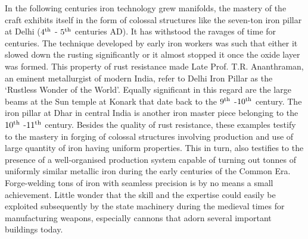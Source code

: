 In the following centuries iron technology grew manifolds, the mastery of the craft exhibits itself in the form of colossal structures like the seven-ton iron pillar at Delhi ($4^{\rm th}$ - $5^{\rm th}$ centuries AD). It has withstood the ravages of time for centuries. The technique developed by early iron workers was such that either it slowed down the rusting significantly or it almost stopped it once the oxide layer was formed. This property of rust resistance made Late Prof. T.R. Ananthraman, an eminent metallurgist of modern India, refer to Delhi Iron Pillar as the ‘Rustless Wonder of the World’. Equally significant in this regard are the large beams at the Sun temple at Konark that date back to the $9^{\rm th}$ -$10^{\rm th}$ century. The iron pillar at Dhar in central India is another iron master piece belonging to the $10^{\rm th}$ -$11^{\rm th}$ century. Besides the quality of rust resistance, these examples testify to the mastery in forging of colossal structures involving production and use of large quantity of iron having uniform properties. This in turn, also testifies to the presence of a well-organised production system capable of turning out tonnes of uniformly similar metallic iron during the early centuries of the Common Era. Forge-welding tons of iron with seamless precision is by no means a small achievement.  Little wonder that the skill and the expertise could easily be exploited subsequently by the state machinery during the medieval times for manufacturing weapons, especially cannons that adorn several important buildings today.

